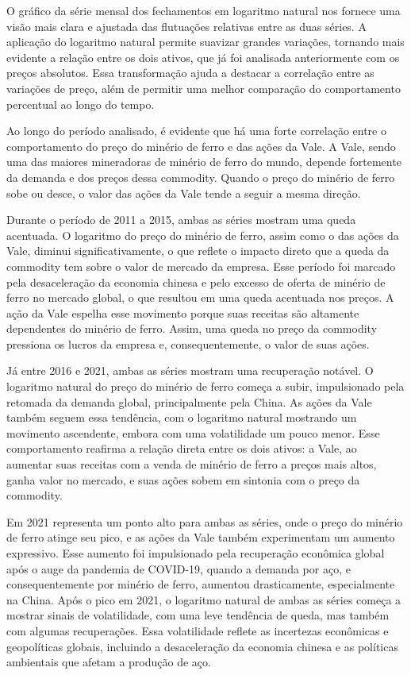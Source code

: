 \documentclass[a4paper,12pt]{article}[abntex2]
\begin{document}
O gráfico da série mensal dos fechamentos em logaritmo natural nos fornece uma visão mais clara e ajustada das flutuações relativas entre as duas séries. A aplicação do logaritmo natural permite suavizar grandes variações, tornando mais evidente a relação entre os dois ativos, que já foi analisada anteriormente com os preços absolutos. Essa transformação ajuda a destacar a correlação entre as variações de preço, além de permitir uma melhor comparação do comportamento percentual ao longo do tempo.

Ao longo do período analisado, é evidente que há uma forte correlação entre o comportamento do preço do minério de ferro e das ações da Vale. A Vale, sendo uma das maiores mineradoras de minério de ferro do mundo, depende fortemente da demanda e dos preços dessa commodity. Quando o preço do minério de ferro sobe ou desce, o valor das ações da Vale tende a seguir a mesma direção.

Durante o período de 2011 a 2015, ambas as séries mostram uma queda acentuada. O logaritmo do preço do minério de ferro, assim como o das ações da Vale, diminui significativamente, o que reflete o impacto direto que a queda da commodity tem sobre o valor de mercado da empresa. Esse período foi marcado pela desaceleração da economia chinesa e pelo excesso de oferta de minério de ferro no mercado global, o que resultou em uma queda acentuada nos preços.
A ação da Vale espelha esse movimento porque suas receitas são altamente dependentes do minério de ferro. Assim, uma queda no preço da commodity pressiona os lucros da empresa e, consequentemente, o valor de suas ações.

Já entre 2016 e 2021, ambas as séries mostram uma recuperação notável. O logaritmo natural do preço do minério de ferro começa a subir, impulsionado pela retomada da demanda global, principalmente pela China. As ações da Vale também seguem essa tendência, com o logaritmo natural mostrando um movimento ascendente, embora com uma volatilidade um pouco menor.
Esse comportamento reafirma a relação direta entre os dois ativos: a Vale, ao aumentar suas receitas com a venda de minério de ferro a preços mais altos, ganha valor no mercado, e suas ações sobem em sintonia com o preço da commodity.

Em 2021 representa um ponto alto para ambas as séries, onde o preço do minério de ferro atinge seu pico, e as ações da Vale também experimentam um aumento expressivo. Esse aumento foi impulsionado pela recuperação econômica global após o auge da pandemia de COVID-19, quando a demanda por aço, e consequentemente por minério de ferro, aumentou drasticamente, especialmente na China.
Após o pico em 2021, o logaritmo natural de ambas as séries começa a mostrar sinais de volatilidade, com uma leve tendência de queda, mas também com algumas recuperações. Essa volatilidade reflete as incertezas econômicas e geopolíticas globais, incluindo a desaceleração da economia chinesa e as políticas ambientais que afetam a produção de aço.
\end{document}
